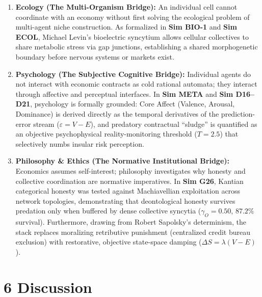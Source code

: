 \documentclass[
]{article}
\providecommand{\tightlist}{%
  \setlength{\itemsep}{0pt}\setlength{\parskip}{0pt}}
\begin{document}
\begin{enumerate}
\def\labelenumi{\arabic{enumi}.}
\tightlist
\item
  \textbf{Ecology (The Multi-Organism Bridge):} An individual cell
  cannot coordinate with an economy without first solving the ecological
  problem of multi-agent niche construction. As formalized in
  \textbf{Sim BIO-1} and \textbf{Sim ECOL}, Michael Levin's bioelectric
  syncytium allows cellular collectives to share metabolic stress via
  gap junctions, establishing a shared morphogenetic boundary before
  nervous systems or markets exist.
\item
  \textbf{Psychology (The Subjective Cognitive Bridge):} Individual
  agents do not interact with economic contracts as cold rational
  automata; they interact through affective and perceptual interfaces.
  In \textbf{Sim META} and \textbf{Sim D16--D21}, psychology is formally
  grounded: Core Affect (Valence, Arousal, Dominance) is derived
  directly as the temporal derivatives of the prediction-error stream
  (\(\varepsilon = V - E\)), and predatory contractual ``sludge'' is
  quantified as an objective psychophysical reality-monitoring threshold
  (\(T = 2.5\)) that selectively numbs insular risk perception.
\item
  \textbf{Philosophy \& Ethics (The Normative Institutional Bridge):}
  Economics assumes self-interest; philosophy investigates why honesty
  and collective coordination are normative imperatives. In \textbf{Sim
  G26}, Kantian categorical honesty was tested against Machiavellian
  exploitation across network topologies, demonstrating that
  deontological honesty survives predation only when buffered by dense
  collective syncytia (\(\gamma_O = 0.50\), \(87.2\%\) survival).
  Furthermore, drawing from Robert Sapolsky's determinism, the stack
  replaces moralizing retributive punishment (centralized credit bureau
  exclusion) with restorative, objective state-space damping
  (\(\Delta S = \lambda(V - E)\)).
\end{enumerate}

\section{6 Discussion}\label{discussion}
\end{document}
